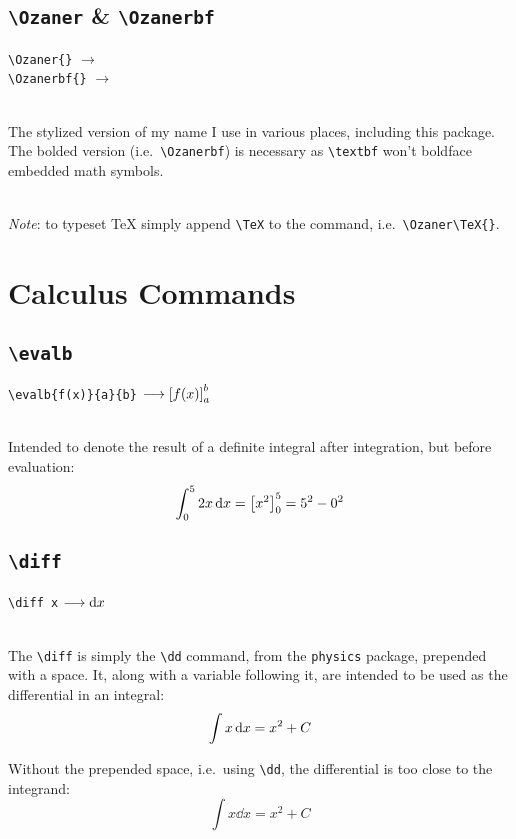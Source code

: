 \documentclass{article}
\begin{document}
\subsection{\texttt{\textbackslash Ozaner} \& \texttt{\textbackslash Ozanerbf}}
\texttt{\textbackslash Ozaner\{\}} $\longrightarrow$ \Ozaner{}\\
\texttt{\textbackslash Ozanerbf\{\}} $\longrightarrow$ \Ozanerbf{}

\noindent\\The stylized version of my name I use in various places, including this package. The bolded version (i.e.\ \texttt{\textbackslash Ozanerbf}) is necessary as \texttt{\textbackslash textbf} won't boldface embedded math symbols.

\noindent\\\textit{Note}: to typeset \Ozaner\TeX{} simply append \texttt{\textbackslash TeX} to the command, i.e.\ \texttt{\textbackslash Ozaner\textbackslash TeX\{\}}.

\section{Calculus Commands}
\subsection{\texttt{\textbackslash evalb}}
\texttt{\textbackslash evalb\{f(x)\}\{a\}\{b\}} $\longrightarrow\displaystyle\left[f(x)\right]_{a}^{b}$

\noindent\\Intended to denote the result of a definite integral after integration, but before evaluation:
$$\int_0^5 2x\mathop{}\!\dd x = \displaystyle\left[x^2\right]_{0}^{5} = 5^2-0^2$$


\subsection{\texttt{\textbackslash diff}}
\texttt{\textbackslash diff x} $\longrightarrow\mathop{}\!\dd x$

\noindent\\The \texttt{\textbackslash diff} is simply the \texttt{\textbackslash dd} command, from the \texttt{physics} package, prepended with a space. It, along with a variable following it, are intended to be used as the differential in an integral:
$$\int x\mathop{}\!\dd x = x^2+C$$

Without the prepended space, i.e.\ using \texttt{\textbackslash dd}, the differential is too close to the integrand:
$$\int x\dd x = x^2+C$$
\end{document}
